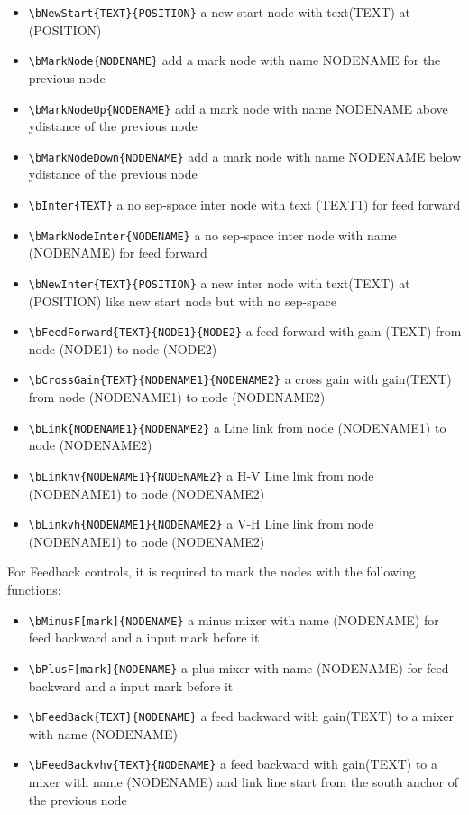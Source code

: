\documentclass[a4paper,onecolumn]{IEEETran}
\begin{document}
\begin{itemize}
\item \verb|\bNewStart{TEXT}{POSITION}| a new start node with text(TEXT) at (POSITION)
\item \verb|\bMarkNode{NODENAME}| add a mark node with name {NODENAME} for the previous node
\item \verb|\bMarkNodeUp{NODENAME}| add a mark node with name {NODENAME} above ydistance of the previous node
\item \verb|\bMarkNodeDown{NODENAME}| add a mark node with name {NODENAME} below ydistance of the previous node
\item \verb|\bInter{TEXT}| a no sep-space inter node with text (TEXT1) for feed forward
\item \verb|\bMarkNodeInter{NODENAME}| a no sep-space inter node with name (NODENAME)  for feed forward
\item \verb|\bNewInter{TEXT}{POSITION}| a new inter node with text(TEXT) at (POSITION) like new start node but with no sep-space
\item \verb|\bFeedForward{TEXT}{NODE1}{NODE2}| a feed forward with gain (TEXT) from node (NODE1) to node (NODE2)
\item \verb|\bCrossGain{TEXT}{NODENAME1}{NODENAME2}| a cross gain with gain(TEXT) from node (NODENAME1) to node (NODENAME2)
\item \verb|\bLink{NODENAME1}{NODENAME2}| a Line link from node (NODENAME1) to node (NODENAME2)
\item \verb|\bLinkhv{NODENAME1}{NODENAME2}| a H-V Line link from node (NODENAME1) to node (NODENAME2)
\item \verb|\bLinkvh{NODENAME1}{NODENAME2}| a V-H Line link from node (NODENAME1) to node (NODENAME2)
\end{itemize}



For Feedback controls, it is required to mark the nodes with the following functions:

\begin{itemize}
\item \verb|\bMinusF[mark]{NODENAME}| a minus mixer with name (NODENAME)  for feed backward and a input mark before it
\item \verb|\bPlusF[mark]{NODENAME}| a plus mixer with name (NODENAME)  for feed backward and a input mark before it
\item \verb|\bFeedBack{TEXT}{NODENAME}| a feed backward with gain(TEXT) to a mixer with name (NODENAME)
\item \verb|\bFeedBackvhv{TEXT}{NODENAME}| a feed backward with gain(TEXT) to a mixer with name (NODENAME) and link line start from the south anchor of the previous node
\end{itemize}
\end{document}
